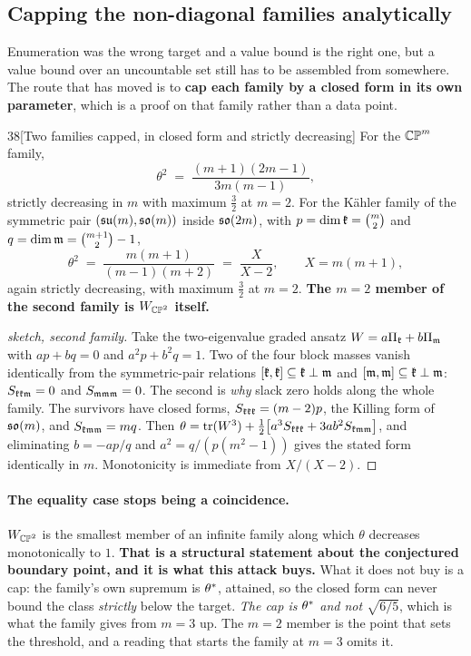 \subsection{Capping the non-diagonal families analytically}\label{sec:families}

Enumeration was the wrong target and a value bound is the right one, but a value bound over an uncountable set still has to be assembled from somewhere. The route that has moved is to \textbf{cap each family by a closed form in its own parameter}, which is a proof on that family rather than a data point.

\begin{Lem}{38}[Two families capped, in closed form and strictly decreasing]
For the $\mathbb{CP}^m$ family,
\[
\theta^2\;=\;\frac{(m+1)(2m-1)}{3m(m-1)},
\]
strictly decreasing in $m$ with maximum $\tfrac32$ at $m=2$. For the K\"ahler family of the symmetric pair $(\mathfrak{su}(m),\mathfrak{so}(m))$ inside $\mathfrak{so}(2m)$, with $p=\dim\mathfrak{k}=\binom m2$ and $q=\dim\mathfrak{m}=\binom{m+1}2-1$,
\[
\theta^2\;=\;\frac{m(m+1)}{(m-1)(m+2)}\;=\;\frac X{X-2},\qquad X=m(m+1),
\]
again strictly decreasing, with maximum $\tfrac32$ at $m=2$. \textbf{The $m=2$ member of the second family is $W_{\mathbb{CP}^2}$ itself.}
\end{Lem}

\begin{proof}[sketch, second family]
Take the two-eigenvalue graded ansatz $W=a\Pi_{\mathfrak{k}}+b\Pi_{\mathfrak{m}}$ with $ap+bq=0$ and $a^2p+b^2q=1$. Two of the four block masses vanish identically from the symmetric-pair relations $[\mathfrak{k},\mathfrak{k}]\subseteq\mathfrak{k}\perp\mathfrak{m}$ and $[\mathfrak{m},\mathfrak{m}]\subseteq\mathfrak{k}\perp\mathfrak{m}$: $S_{\mathfrak{k}\mathfrak{k}\mathfrak{m}}=0$ and $S_{\mathfrak{m}\mathfrak{m}\mathfrak{m}}=0$. The second is \emph{why} slack zero holds along the whole family. The survivors have closed forms, $S_{\mathfrak{k}\mathfrak{k}\mathfrak{k}}=(m-2)p$, the Killing form of $\mathfrak{so}(m)$, and $S_{\mathfrak{k}\mathfrak{m}\mathfrak{m}}=mq$. Then $\theta=\operatorname{tr}(W^3)+\tfrac12\big[a^3S_{\mathfrak{k}\mathfrak{k}\mathfrak{k}}+3ab^2S_{\mathfrak{k}\mathfrak{m}\mathfrak{m}}\big]$, and eliminating $b=-ap/q$ and $a^2=q/(p(m^2-1))$ gives the stated form identically in $m$. Monotonicity is immediate from $X/(X-2)$.
\end{proof}

\paragraph{The equality case stops being a coincidence.} $W_{\mathbb{CP}^2}$ is the smallest member of an infinite family along which $\theta$ decreases monotonically to $1$. \textbf{That is a structural statement about the conjectured boundary point, and it is what this attack buys.} What it does not buy is a cap: the family's own supremum is $\theta^{*}$, attained, so the closed form can never bound the class \emph{strictly} below the target. \emph{The cap is $\theta^{*}$ and not $\sqrt{6/5}$}, which is what the family gives from $m=3$ up. The $m=2$ member is the point that sets the threshold, and a reading that starts the family at $m=3$ omits it.

